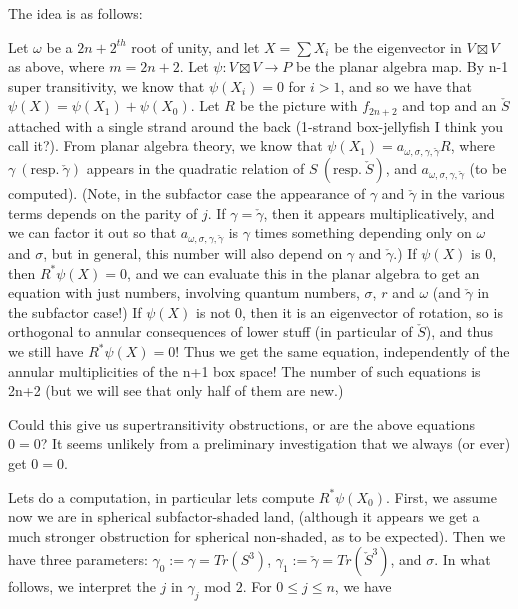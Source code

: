 \documentclass[12pt]{article}
\begin{document}
The idea is as follows:

Let $\omega$ be a $2n+2^{th}$ root of unity, and let $X=\sum X_{i}$ be the eigenvector in $V\boxtimes V$ as above, where $m=2n+2$. Let $\psi: V\boxtimes V\rightarrow P$ be the planar algebra map.  By n-1 super transitivity, we know that $\psi(X_i)=0$ for $i>1$, and so we have that $\psi(X)=\psi(X_1)+\psi(X_0)$.  Let $R$ be the picture with $f_{2n+2}$ and top and an $\check{S}$ attached with a single strand around the back (1-strand box-jellyfish I think you call it?).  From planar algebra theory, we know that $\psi(X_1)=a_{\omega, \sigma, \gamma, \check{\gamma}} R$, where $\gamma\ (\text{resp.}\ \check{\gamma})$ appears in the quadratic relation of $S\ (\text{resp.}\ \check{S})$, and $a_{\omega, \sigma, \gamma, \check{\gamma}}$ (to be computed). (Note, in the subfactor case the appearance of $\gamma$ and $\check{\gamma}$ in the various terms depends on the parity of $j$.  If $\gamma=\check{\gamma}$, then it appears multiplicatively, and we can factor it out so that $a_{\omega, \sigma, \gamma, \check{\gamma}}$ is $\gamma$ times something depending only on $\omega$ and $\sigma$, but in general, this number will also depend on $\gamma$ and $\check{\gamma}$.) If $\psi(X)$ is $0$, then $R^{*}\psi(X)=0$, and we can evaluate this in the planar algebra to get an equation with just numbers, involving quantum numbers, $\sigma$, $r$ and $\omega$ (and $\check{\gamma}$ in the subfactor case!)  If $\psi(X)$ is not $0$, then it is an eigenvector of rotation, so is orthogonal to annular consequences of lower stuff (in particular of $\check{S}$), and thus we still have $R^{*}\psi(X)=0$!  Thus we get the same equation, independently of the annular multiplicities of the n+1 box space!  The number of such equations is 2n+2 (but we will see that only half of them are new.)




Could this give us supertransitivity obstructions, or are the above equations  $0=0$?  It seems unlikely from a preliminary investigation that we always (or ever) get $0=0$.

\bigskip

Lets do a computation,  in particular lets compute $R^{*}\psi(X_0)$.  First, we assume now we are in spherical subfactor-shaded land, (although it appears we get a much stronger obstruction for spherical non-shaded, as to be expected).  Then we have three parameters: $\gamma_{0}:=\gamma=Tr(S^{3})$,  $\gamma_{1}:=\check{\gamma}=Tr(\check{S}^{3})$, and $\sigma$.  In what follows, we interpret the $j$ in $\gamma_{j}$ mod $2$. For $0\le j\le n$, we have
\end{document}
